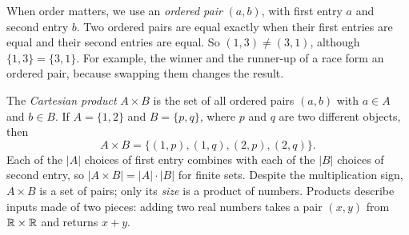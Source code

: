 When order matters, we use an \emph{ordered pair} $(a,b)$, with first entry $a$ and second entry $b$. Two ordered pairs are equal exactly when their first entries are equal and their second entries are equal. So $(1,3)\ne(3,1)$, although $\{1,3\}=\{3,1\}$. For example, the winner and the runner-up of a race form an ordered pair, because swapping them changes the result.

The \emph{Cartesian product} $A\times B$ is the set of all ordered pairs $(a,b)$ with $a\in A$ and $b\in B$. If $A=\{1,2\}$ and $B=\{p,q\}$, where $p$ and $q$ are two different objects, then
\[
A\times B=\{(1,p),(1,q),(2,p),(2,q)\}.
\]
Each of the $|A|$ choices of first entry combines with each of the $|B|$ choices of second entry, so $|A\times B|=|A|\cdot|B|$ for finite sets. Despite the multiplication sign, $A\times B$ is a set of pairs; only its \emph{size} is a product of numbers. Products describe inputs made of two pieces: adding two real numbers takes a pair $(x,y)$ from $\mathbb R\times\mathbb R$ and returns $x+y$.
